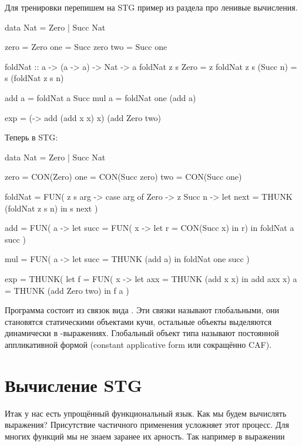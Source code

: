 Для тренировки перепишем на STG пример из раздела про ленивые
вычисления.


\begin{code}
data Nat = Zero | Succ Nat

zero    = Zero
one     = Succ zero
two     = Succ one

foldNat :: a -> (a -> a) -> Nat -> a
foldNat z  s  Zero      = z
foldNat z  s  (Succ n)  = s (foldNat z s n)

add a = foldNat a   Succ
mul a = foldNat one (add a) 

exp = (\x -> add (add x x) x) (add Zero two)
\end{code}

Теперь в STG:


\begin{code}
data Nat = Zero | Succ Nat

zero    = CON(Zero)
one     = CON(Succ zero)
two     = CON(Succ one)

foldNat = FUN( z s arg -> 
            case arg of 
                Zero    -> z
                Succ n  -> let next = THUNK (foldNat z s n)
                           in  s next  
          )

add     = FUN( a ->
            let succ = FUN( x -> 
                        let r = CON(Succ x) 
                        in r)
            in  foldNat a succ
          )

mul     = FUN( a -> 
            let succ = THUNK (add a)
            in  foldNat one succ
          )

exp     = THUNK( 
            let f = FUN( x -> let axx = THUNK (add x x)
                              in  add axx x) 
                a = THUNK (add Zero two)
            in  f a    
          )
\end{code}

Программа состоит из связок вида . Эти связки
называют глобальными, они становятся статическими объектами кучи,
остальные объекты выделяются динамически в -выражениях.
Глобальный объект типа  называют постоянной аппликативной
формой (constant applicative form или сокращённо CAF).

\section{Вычисление STG}

Итак у нас есть упрощённый функциональный язык. Как мы будем вычислять
выражения? Присутствие частичного применения усложняет этот процесс. Для
многих функций мы не знаем заранее их арность. Так например в выражении


